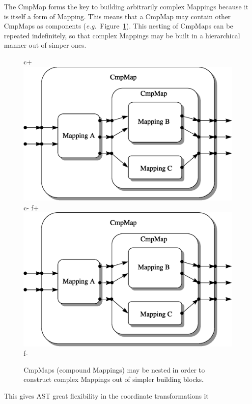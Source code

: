 \documentclass[twoside,11pt]{article}
\newenvironment{latexonly}{}{}
\begin{document}
{\begin{latexonly}
   The CmpMap forms the key to building arbitrarily complex Mappings
   because it is itself a form of Mapping. This means that a CmpMap may
   contain other CmpMaps as components
   ({\em{e.g.}}\ Figure~\ref{fig:complexcmpmap}). This nesting of CmpMaps
   can be repeated indefinitely, so that complex Mappings may be built in
   a hierarchical manner out of simper ones.
   \begin{figure}
   \begin{center}
c+
   \includegraphics[scale=0.6]{sun211_figures/complex.eps}
c-
f+
   \includegraphics[scale=0.6]{sun210_figures/complex.eps}
f-
   \caption{CmpMaps (compound Mappings) may be nested in order to
   construct complex Mappings out of simpler building blocks.}
   \label{fig:complexcmpmap}
   \end{center}
   \end{figure}
   This gives AST great flexibility in the coordinate transformations it

\end{latexonly}}
\end{document}
